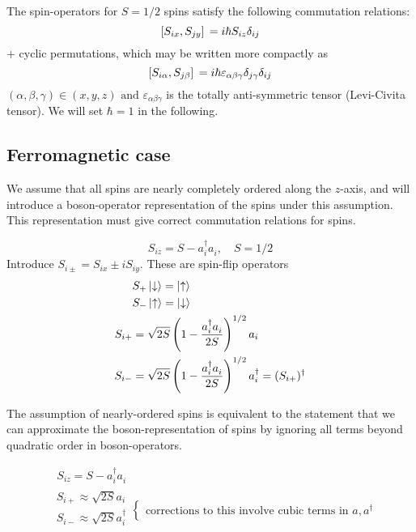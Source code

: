 The spin-operators for $S = 1/2$ spins satisfy the following commutation relations:
\begin{equation}
    \comm*{S_{ix}}{S_{jy}} = i\hbar S_{iz}\delta_{ij}
\end{equation}
+ cyclic permutations, which may be written more compactly as
\begin{equation}
    \comm*{S_{i\alpha}}{S_{j\beta}} = i\hbar \varepsilon_{\alpha\beta\gamma} \delta_{j\gamma} \delta_{ij} \\
\end{equation}
$(\alpha, \beta, \gamma) \in (x, y, z)  \text{ and } \varepsilon_{\alpha\beta\gamma}$ is the totally anti-symmetric tensor (Levi-Civita tensor). We will set $\hbar = 1$ in the following. \\

\subsection{Ferromagnetic case}
We assume that all spins are nearly completely ordered along the $z$-axis, and will introduce a boson-operator representation of the spins under this assumption. This representation must give correct commutation relations for spins.

\begin{equation}
    S_{iz} = S - a_i^\dagger a_i^{}, \quad S = 1/2
\end{equation}
Introduce $S_{i\pm} = S_{ix} \pm iS_{iy}$. These are spin-flip operators
\begin{align}
    &S_+ \ket{\downarrow} = \ket{\uparrow} \\
    &S_- \ket{\uparrow} = \ket{\downarrow} \\
    S_{i+} &= \sqrt{2S}\left (1-\frac{a_i^\dagger a_i^{}}{2S}\right )^{1/2}a_i \\
    S_{i-} &= \sqrt{2S}\left (1-\frac{a_i^\dagger a_i^{}}{2S}\right )^{1/2}a_i^\dagger = (S_{i+})^\dagger
\end{align}

The assumption of nearly-ordered spins is equivalent to the statement that we can approximate the boson-representation of spins by ignoring all terms beyond quadratic order in boson-operators.

\begin{align}
& \ \ S_{iz} = S - a_i^\dagger a_i^{} \\
&\begin{array}{c}
S_{i+} \approx \sqrt{2S}a_i \\
S_{i-} \approx \sqrt{2S}a_i^\dagger \\
\end{array}
\begin{cases}
\text{corrections to this involve cubic terms in } a, a^\dagger 
\end{cases}
\end{align}

